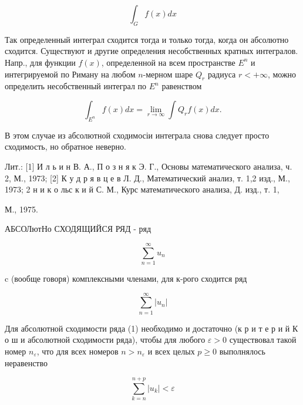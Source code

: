 \documentclass[10pt]{article}
\begin{document}
\[

\int_{G} f(x) d x

\]



Так определенный интеграл сходится тогда и только тогда, когда он абсолютно сходится. Существуют и другие определения несобственных кратных интегралов. Напр., для функции $f(x)$, определенной на всем пространстве $E^{n}$ и интегрируемой по Риману на любом $n$-мерном шаре $Q_{r}$ радиуса $r<+\infty$, можно определить несобственный интеграл по $E^{n}$ равенством



\[

\int_{E^{n}} f(x) d x=\lim _{r \rightarrow \infty} \int Q_{r} f(x) d x .

\]



В этом случае из абсолютной сходимосіи интеграла снова следует просто сходимость, но обратное неверно.



Лит.: [1] И л ь и н В. А., П о з н я к Э. Г., Основы математического анализа, ч. 2, М., 1973; [2] К у д р я в ц е в Л. Д., Математический анализ, т. 1,2 изд., М., 1973; 2 н и к о льс к и й С. М., Курс математического анализа, Д. изд., т. 1,

М., 1975.



АБСОЛютНо СХОДЯЩИЙСЯ РЯД - ряд



\[

\sum_{n=1}^{\infty} u_{n}

\]



c (вообще говоря) комплексными членами, для к-рого сходится ряд



\[

\sum_{n=1}^{\infty}\left|u_{n}\right|

\]



Для абсолютной сходимости ряда (1) необходимо и достаточно (к р и т е р и й К о ш и абсолютной сходимости ряда), чтобы для любого $\varepsilon>0$ существовал такой номер $n_{\varepsilon}$, что для всех номеров $n>n_{\varepsilon}$ и всех целых $p \geqslant 0$ выполнялось неравенство



\[

\sum_{k=n}^{n+p}\left|u_{k}\right|<\varepsilon

\]
\end{document}
